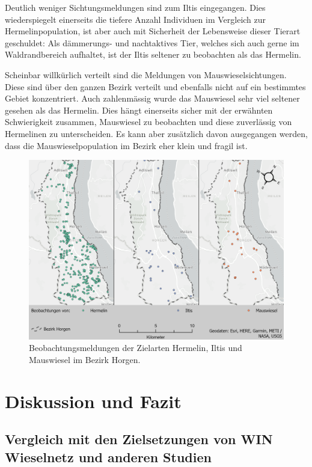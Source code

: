 \documentclass[
  oneside]{scrbook}
\begin{document}
Deutlich weniger Sichtungsmeldungen sind zum Iltis eingegangen. Dies wiederspiegelt einerseits die tiefere Anzahl Individuen im Vergleich zur Hermelinpopulation, ist aber auch mit Sicherheit der Lebensweise dieser Tierart geschuldet: Als dämmerungs- und nachtaktives Tier, welches sich auch gerne im Waldrandbereich aufhaltet, ist der Iltis seltener zu beobachten als das Hermelin.

Scheinbar willkürlich verteilt sind die Meldungen von Mauswieselsichtungen. Diese sind über den ganzen Bezirk verteilt und ebenfalls nicht auf ein bestimmtes Gebiet konzentriert. Auch zahlenmässig wurde das Mauswiesel sehr viel seltener gesehen als das Hermelin. Dies hängt einerseits sicher mit der erwähnten Schwierigkeit zusammen, Mauswiesel zu beobachten und diese zuverlässig von Hermelinen zu unterscheiden. Es kann aber zusätzlich davon ausgegangen werden, dass die Mauswieselpopulation im Bezirk eher klein und fragil ist.



\begin{figure}
\includegraphics[width=1\linewidth]{images/Layout_Beobachtungsmeldungen} \caption{Beobachtungsmeldungen der Zielarten Hermelin, Iltis und Mauswiesel im Bezirk Horgen.}\label{fig:layoutbeobachtungsmeldungen}
\end{figure}

\hypertarget{diskussion-und-fazit}{%
\chapter{Diskussion und Fazit}\label{diskussion-und-fazit}}

\hypertarget{vergleich-mit-den-zielsetzungen-von-win-wieselnetz-und-anderen-studien}{%
\section{Vergleich mit den Zielsetzungen von WIN Wieselnetz und anderen Studien}\label{vergleich-mit-den-zielsetzungen-von-win-wieselnetz-und-anderen-studien}}
\end{document}

